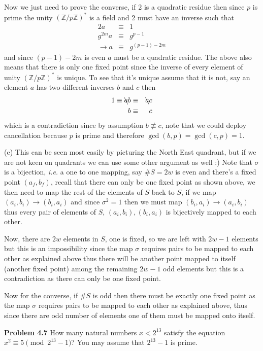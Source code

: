 \documentclass[aps,preprint,preprintnumbers,nofootinbib,showpacs,prd]{revtex4-1}
\newcommand{\ie}{{\it i.e.} }
\newcommand{\nbea}{\begin{eqnarray*}}
\newcommand{\neea}{\end{eqnarray*}}
\begin{document}
Now we just need to prove the converse, if 2 is a quadratic residue then since $p$ is prime the unity $(\mathbb{Z}/p\mathbb{Z})^*$ is a field and 2 must have an inverse such that
%
\nbea
2a & \equiv & 1 \\
g^{2m} a & \equiv & g^{p-1} \\
\to a & \equiv & g^{(p-1) - 2m}
\neea
%
and since $(p-1) - 2m$ is even $a$ must be a quadratic residue. The above also means that there is only one fixed point since the inverse of every element of unity $(\mathbb{Z}/p\mathbb{Z})^*$ is unique. To see that it's unique assume that it is not, say an element $a$ has two different inverses $b$ and $c$ then
%
\nbea
1 \equiv \bcancel{a}b & \equiv & \bcancel{a}c \\
b & \equiv & c
\neea
%
which is a contradiction since by assumption $b \not\equiv c$, note that we could deploy cancellation because $p$ is prime and therefore $\gcd(b,p) = \gcd(c,p) = 1$.

(e) This can be seen most easily by picturing the North East quadrant, but if we are not keen on quadrants we can use some other argument as well :) Note that $\sigma$ is a bijection, \ie a one to one mapping, say $\#S = 2w$ is even and there's a fixed point $(a_f,b_f)$, recall that there can only be one fixed point as shown above, we then need to map the rest of the elements of $S$ back to $S$, if we map $(a_i,b_i) \rightarrow (b_i,a_i)$ and since $\sigma^2 = 1$ then we must map $(b_i,a_i) \rightarrow (a_i,b_i)$ thus every pair of elements of $S$, $(a_i,b_i),(b_i,a_i)$ is bijectively mapped to each other.

Now, there are $2w$ elements in $S$, one is fixed, so we are left with $2w-1$ elements but this is an impossibility since the map $\sigma$ requires pairs to be mapped to each other as explained above thus there will be another point mapped to itself (another fixed point) among the remaining $2w-1$ odd elements but this is a contradiction as there can only be one fixed point.

Now for the converse, if $\#S$ is odd then there must be exactly one fixed point as the map $\sigma$ requires pairs to be mapped to each other as explained above, thus since there are odd number of elements one of them must be mapped onto itself.

{\bf Problem 4.7} How many natural numbers $x < 2^{13}$ satisfy the equation $x^2 \equiv 5 \pmod{2^{13}-1}$? You may assume that $2^{13} - 1$ is prime.
\end{document}
